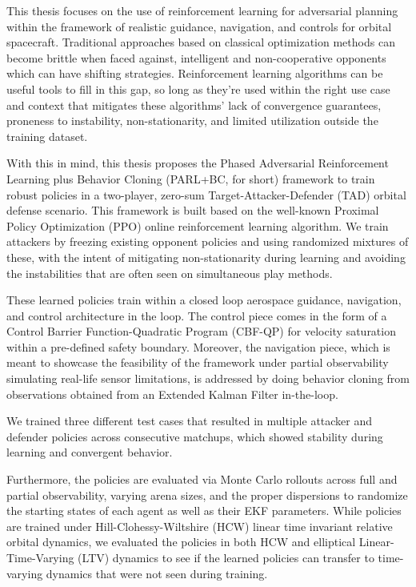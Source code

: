 This thesis focuses on the use of reinforcement learning for adversarial planning within the framework of realistic guidance, navigation, and controls for orbital spacecraft.  Traditional approaches based on classical optimization methods can become brittle when faced against, intelligent and non-cooperative opponents which can have shifting strategies. Reinforcement learning algorithms can be useful tools to fill in this gap, so long as they're used within the right use case and context that mitigates these algorithms'  lack of convergence guarantees, proneness to instability, non-stationarity, and limited utilization outside the training dataset.

With this in mind, this thesis proposes the Phased Adversarial Reinforcement Learning plus Behavior Cloning (PARL+BC, for short) framework to train robust policies in a two-player, zero-sum Target-Attacker-Defender (TAD) orbital defense scenario. This framework is built based on the well-known Proximal Policy Optimization (PPO) online reinforcement learning algorithm. We train attackers by freezing existing opponent policies and using randomized mixtures of these, with the intent of mitigating non-stationarity during learning and avoiding the instabilities that are often seen on simultaneous play methods. 

These learned policies train within a closed loop aerospace guidance, navigation, and control architecture in the loop. The control piece comes in the form of a Control Barrier Function-Quadratic Program (CBF-QP) for velocity saturation within a pre-defined safety boundary. Moreover, the navigation piece, which is meant to showcase the feasibility of the framework under partial observability simulating real-life sensor limitations, is addressed by doing behavior cloning from observations obtained from an Extended Kalman Filter in-the-loop. 

We trained three different test cases that resulted in multiple attacker and defender policies across consecutive matchups, which showed stability during learning and convergent behavior.

Furthermore, the policies are evaluated via Monte Carlo rollouts across full and partial observability, varying arena sizes, and the proper dispersions to randomize the starting states of each agent as well as their EKF parameters. While policies are trained under Hill-Clohessy-Wiltshire (HCW) linear time invariant relative orbital dynamics, we evaluated the policies in both HCW and elliptical Linear-Time-Varying (LTV) dynamics to see if the learned policies can transfer to time-varying dynamics that were not seen during training.

